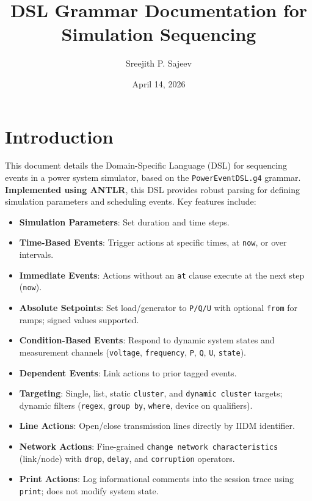 \documentclass[12pt]{article}
\title{\textbf{DSL Grammar Documentation for Simulation Sequencing}}
\author{Sreejith P. Sajeev}
\date{April 14, 2026}
\begin{document}
\maketitle

\section{Introduction}

This document details the Domain-Specific Language (DSL) for sequencing events in a power system simulator, based
on the \texttt{PowerEventDSL.g4} grammar. \textbf{Implemented using ANTLR}, this DSL provides robust parsing for
defining simulation parameters and scheduling events. Key features include:

\begin{itemize}
  \item \textbf{Simulation Parameters}: Set duration and time steps.
  \item \textbf{Time-Based Events}: Trigger actions at specific times, at \texttt{now}, or over intervals.
  \item \textbf{Immediate Events}: Actions without an \texttt{at} clause execute at the next step (\texttt{now}).
  \item \textbf{Absolute Setpoints}: Set load/generator to \texttt{P/Q/U} with optional \texttt{from} for ramps;
        signed values supported.
  \item \textbf{Condition-Based Events}: Respond to dynamic system states and measurement channels
        (\texttt{voltage}, \texttt{frequency}, \texttt{P}, \texttt{Q}, \texttt{U}, \texttt{state}).
  \item \textbf{Dependent Events}: Link actions to prior tagged events.
  \item \textbf{Targeting}: Single, list, static \texttt{cluster}, and \texttt{dynamic cluster} targets; dynamic
        filters (\texttt{regex}, \texttt{group by}, \texttt{where}, device on qualifiers).
  \item \textbf{Line Actions}: Open/close transmission lines directly by IIDM identifier.
  \item \textbf{Network Actions}: Fine-grained \texttt{change network characteristics} (link/node) with
        \texttt{drop}, \texttt{delay}, and \texttt{corruption} operators.
  \item \textbf{Print Actions}: Log informational comments into the session trace using \texttt{print}; does not
        modify system state.
\end{itemize}
\end{document}
